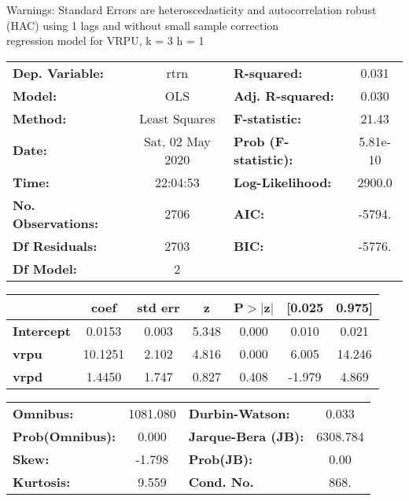 Warnings: \newline
 [1] Standard Errors are heteroscedasticity and autocorrelation robust (HAC) using 1 lags and without small sample correction\\ 

regression model for VRPU, k = 3 h = 1\begin{center}
\begin{tabular}{lclc}
\toprule
\textbf{Dep. Variable:}    &       rtrn       & \textbf{  R-squared:         } &     0.031   \\
\textbf{Model:}            &       OLS        & \textbf{  Adj. R-squared:    } &     0.030   \\
\textbf{Method:}           &  Least Squares   & \textbf{  F-statistic:       } &     21.43   \\
\textbf{Date:}             & Sat, 02 May 2020 & \textbf{  Prob (F-statistic):} &  5.81e-10   \\
\textbf{Time:}             &     22:04:53     & \textbf{  Log-Likelihood:    } &    2900.0   \\
\textbf{No. Observations:} &        2706      & \textbf{  AIC:               } &    -5794.   \\
\textbf{Df Residuals:}     &        2703      & \textbf{  BIC:               } &    -5776.   \\
\textbf{Df Model:}         &           2      & \textbf{                     } &             \\
\bottomrule
\end{tabular}
\begin{tabular}{lcccccc}
                   & \textbf{coef} & \textbf{std err} & \textbf{z} & \textbf{P$> |$z$|$} & \textbf{[0.025} & \textbf{0.975]}  \\
\midrule
\textbf{Intercept} &       0.0153  &        0.003     &     5.348  &         0.000        &        0.010    &        0.021     \\
\textbf{vrpu}      &      10.1251  &        2.102     &     4.816  &         0.000        &        6.005    &       14.246     \\
\textbf{vrpd}      &       1.4450  &        1.747     &     0.827  &         0.408        &       -1.979    &        4.869     \\
\bottomrule
\end{tabular}
\begin{tabular}{lclc}
\textbf{Omnibus:}       & 1081.080 & \textbf{  Durbin-Watson:     } &    0.033  \\
\textbf{Prob(Omnibus):} &   0.000  & \textbf{  Jarque-Bera (JB):  } & 6308.784  \\
\textbf{Skew:}          &  -1.798  & \textbf{  Prob(JB):          } &     0.00  \\
\textbf{Kurtosis:}      &   9.559  & \textbf{  Cond. No.          } &     868.  \\
\bottomrule
\end{tabular}
\end{center}

